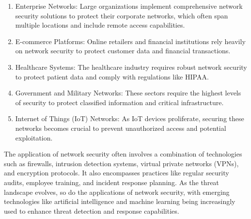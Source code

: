 \documentclass{article}
\begin{document}
\begin{enumerate}
    \item Enterprise Networks: Large organizations implement comprehensive network security solutions to protect their corporate networks, which often span multiple locations and include remote access capabilities.
    \item E-commerce Platforms: Online retailers and financial institutions rely heavily on network security to protect customer data and financial transactions.
    \item Healthcare Systems: The healthcare industry requires robust network security to protect patient data and comply with regulations like HIPAA.
    \item Government and Military Networks: These sectors require the highest levels of security to protect classified information and critical infrastructure.
    \item Internet of Things (IoT) Networks: As IoT devices proliferate, securing these networks becomes crucial to prevent unauthorized access and potential exploitation.
\end{enumerate}

The application of network security often involves a combination of technologies such as firewalls, intrusion detection systems, virtual private networks (VPNs), and encryption protocols. It also encompasses practices like regular security audits, employee training, and incident response planning. As the threat landscape evolves, so do the applications of network security, with emerging technologies like artificial intelligence and machine learning being increasingly used to enhance threat detection and response capabilities.


\end{document}
